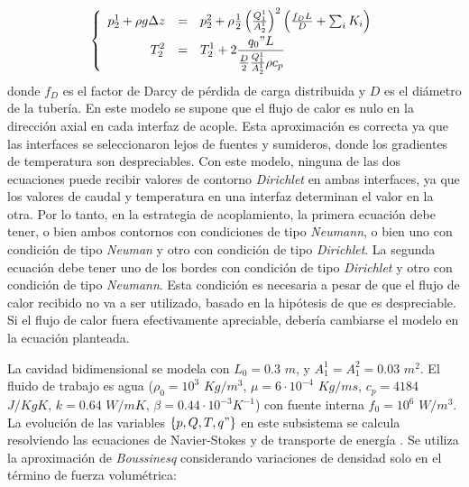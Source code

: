\begin{equation}
\left\{ \begin{array}{rcl}
p_2^1 + \rho g \Delta z &=& p_2^2 + \rho \frac{1}{2} \left( \frac{Q_1^1}{A_2^1} \right)^2  \left( \frac {f_D L} {D} + \sum_i K_i \right) \\ [0.2cm]
\displaystyle T_2^2 &=& \displaystyle T_2^1 + 2 \frac {q_0" L}{\frac{D}{2} \frac{Q_1^1}{A_2^1}\rho c_p}
\label{eq-intercambiador}
\end{array}
\right.
\end{equation}
donde $f_D$ es el factor de Darcy de pérdida de carga distribuida y $D$ es el diámetro de la tubería.
En este modelo se supone que el flujo de calor es nulo en la dirección axial en cada interfaz de acople.
Esta aproximación es correcta ya que las interfaces se seleccionaron lejos de fuentes y sumideros, donde los gradientes de temperatura son despreciables.
Con este modelo, ninguna de las dos ecuaciones puede recibir valores de contorno \textit{Dirichlet} en ambas interfaces,
ya que los valores de caudal y temperatura en una interfaz determinan el valor en la otra.
Por lo tanto, en la estrategia de acoplamiento, la primera ecuación debe tener, o bien ambos contornos con condiciones de tipo \textit{Neumann}, 
o bien uno con condición de tipo \textit{Neuman} y otro con condición de tipo \textit{Dirichlet}.
La segunda ecuación debe tener uno de los bordes con condición de tipo \textit{Dirichlet} y otro con condición de tipo \textit{Neumann}.
Esta condición es necesaria a pesar de que el flujo de calor recibido no va a ser utilizado, basado en la hipótesis de que es despreciable.
Si el flujo de calor fuera efectivamente apreciable, debería cambiarse el modelo en la ecuación planteada.

La cavidad bidimensional se modela con $L_0=0.3$ $m$, y $A_1^1=A_1^2=0.03$ $m^2$.
El fluido de trabajo es agua ($\rho_0=10^3$ $Kg/m^3$, $\mu=6\cdot 10^{-4}$ $Kg/ms$, $c_p=4184$ $J/KgK$, 
$k=0.64$ $W/mK$, $\beta=0.44\cdot10^{-3}K^{-1}$)
con fuente interna $f_0=10^6$ $W/m^3$.
La evolución de las variables $\{p,Q,T,q"\}$ en este subsistema se calcula resolviendo las ecuaciones de Navier-Stokes {\cite{gunzburger}}
y de transporte de energía \cite{kays}. 
Se utiliza la aproximación de \textit{Boussinesq} considerando variaciones de densidad solo en el término de fuerza volumétrica:

